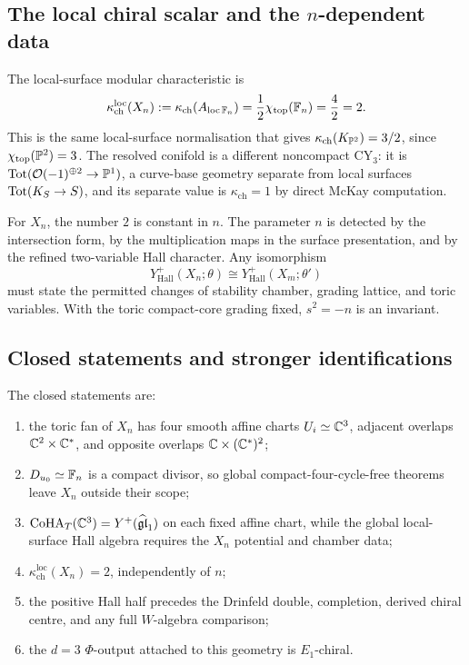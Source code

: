 \subsection*{The local chiral scalar and the \(n\)-dependent data}

The local-surface modular characteristic is
\[
 \kappa_{\mathrm{ch}}^{\mathrm{loc}}(X_n)
 :=\kappa_{\mathrm{ch}}(A_{\mathrm{loc}\,\F_n})
 =\frac{1}{2}\chi_{\mathrm{top}}(\F_n)
 =\frac{4}{2}
 =2 .
\]
This is the same local-surface normalisation that gives
\(\kappa_{\mathrm{ch}}(K_{\P^2})=3/2\), since
\(\chi_{\mathrm{top}}(\P^2)=3\). The resolved conifold is a different
noncompact CY$_3$: it is \(\Tot(\cO(-1)^{\oplus2}\to\P^1)\), a
curve-base geometry separate from local surfaces \(\Tot(K_S\to S)\),
and its separate value is
\(\kappa_{\mathrm{ch}}=1\) by direct McKay computation.

For \(X_n\), the number \(2\) is constant in \(n\). The parameter
\(n\) is detected by the intersection form, by the multiplication maps
in the surface presentation, and by the refined two-variable Hall
character. Any isomorphism
\[
 Y^+_{\mathrm{Hall}}(X_n;\theta)
 \cong
 Y^+_{\mathrm{Hall}}(X_m;\theta')
\]
must state the permitted changes of stability chamber, grading lattice,
and toric variables. With the toric compact-core grading fixed,
\(s^2=-n\) is an invariant.

\subsection*{Closed statements and stronger identifications}

The closed statements are:
\begin{enumerate}
 \item the toric fan of \(X_n\) has four smooth affine charts
 \(U_i\simeq\C^3\), adjacent overlaps \(\C^2\times\C^*\), and opposite
 overlaps \(\C\times(\C^*)^2\);
 \item \(D_{u_0}\simeq\F_n\) is a compact divisor, so global
 compact-four-cycle-free theorems leave \(X_n\) outside their scope;
 \item \(\CoHA_T(\C^3)=Y^+(\widehat{\mathfrak{gl}}_1)\) on each fixed
 affine chart, while the global local-surface Hall algebra requires the
 \(X_n\) potential and chamber data;
 \item \(\kappa_{\mathrm{ch}}^{\mathrm{loc}}(X_n)=2\), independently
 of \(n\);
 \item the positive Hall half precedes the Drinfeld double, completion,
 derived chiral centre, and any full \(W\)-algebra comparison;
 \item the \(d=3\) \(\Phi\)-output attached to this geometry is
 \(E_1\)-chiral.
\end{enumerate}

